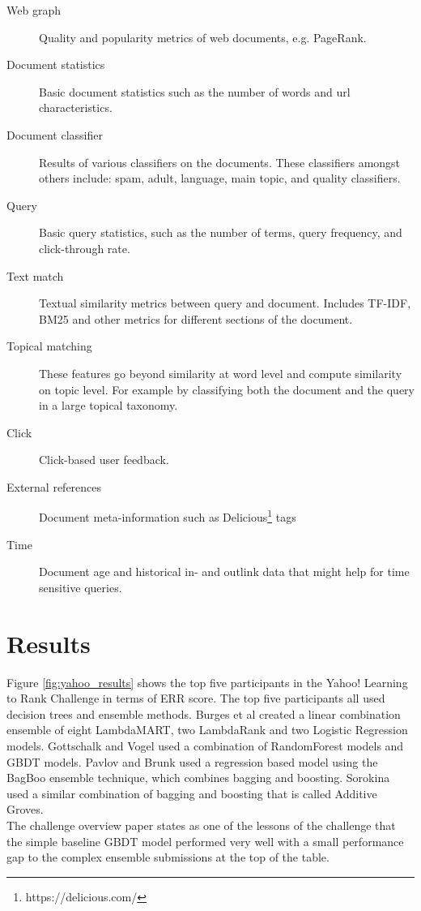 \begin{description}
\item[Web graph]{Quality and popularity metrics of web documents, e.g. PageRank\cite{Page1999}}.
\item[Document statistics]{Basic document statistics such as the number of words and url characteristics.}
\item[Document classifier]{Results of various classifiers on the documents. These classifiers amongst others include: spam, adult, language, main topic, and quality classifiers.}
\item[Query]{Basic query statistics, such as the number of terms, query frequency, and click-through rate.}
\item[Text match]{Textual similarity metrics between query and document. Includes \ac{TF-IDF}, BM25\cite{Robertson2009} and other metrics for different sections of the document.}
\item[Topical matching]{These features go beyond similarity at word level and compute similarity on topic level. For example by classifying both the document and the query in a large topical taxonomy.}
\item[Click]{Click-based user feedback.}
\item[External references]{Document meta-information such as Delicious\footnote{https://delicious.com/} tags}
\item[Time]{Document age and historical in- and outlink data that might help for time sensitive queries.}
\end{description}

\section{Results}
Figure \ref{fig:yahoo_results} shows the top five participants in the Yahoo! Learning to Rank Challenge in terms of ERR score. The top five participants all used decision trees and ensemble methods. Burges et al\cite{Burges2011} created a linear combination ensemble of eight LambdaMART\cite{Burges2010}, two LambdaRank and two Logistic Regression models. Gottschalk and Vogel used a combination of RandomForest models and \ac{GBDT} models. Pavlov and Brunk used a regression based model using the BagBoo\cite{Pavlov2010} ensemble technique, which combines bagging and boosting. Sorokina used a similar combination of bagging and boosting that is called Additive Groves\cite{Sorokina2007}.\\

The challenge overview paper states as one of the lessons of the challenge that the simple baseline \ac{GBDT} model performed very well with a small performance gap to the complex ensemble submissions at the top of the table.

